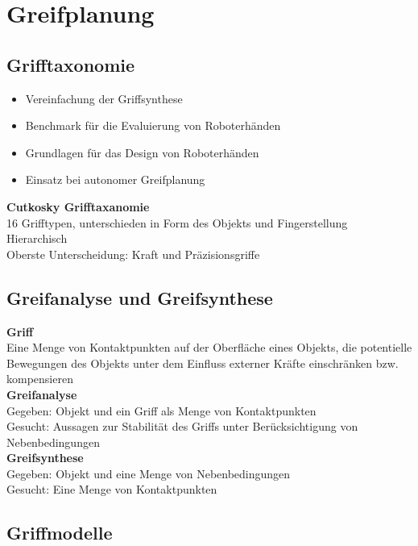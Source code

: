 

\section{Greifplanung}

\subsection{Grifftaxonomie}
\begin{itemize}
\item Vereinfachung der Griffsynthese
\item Benchmark für die Evaluierung von Roboterhänden
\item Grundlagen für das Design von Roboterhänden
\item Einsatz bei autonomer Greifplanung
\end{itemize}

\textbf{Cutkosky Grifftaxanomie}\\
16 Grifftypen, unterschieden in Form des Objekts und Fingerstellung\\
Hierarchisch\\
Oberste Unterscheidung: Kraft und Präzisionsgriffe

\subsection{Greifanalyse und Greifsynthese}
\textbf{Griff}\\
Eine Menge von Kontaktpunkten auf der Oberfläche eines Objekts, die potentielle Bewegungen des Objekts unter dem
Einfluss externer Kräfte einschränken bzw. kompensieren\\

\textbf{Greifanalyse}\\
Gegeben: Objekt und ein Griff als Menge von Kontaktpunkten\\
Gesucht: Aussagen zur Stabilität des Griffs unter Berücksichtigung von Nebenbedingungen\\

\textbf{Greifsynthese}\\
Gegeben: Objekt und eine Menge von Nebenbedingungen\\
Gesucht: Eine Menge von Kontaktpunkten

\subsection{Griffmodelle}

